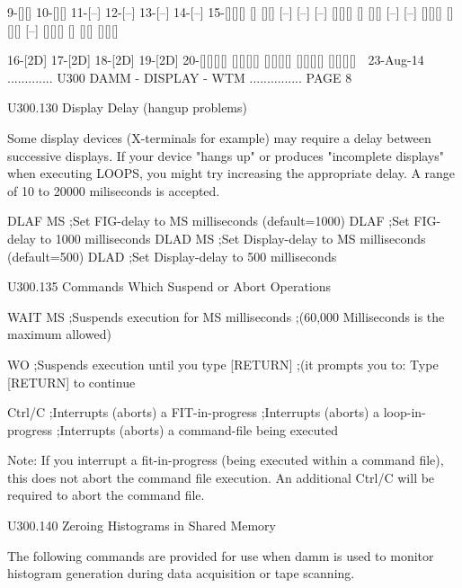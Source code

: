    9-[][]  10-[][]  11-[--]  12-[--]  13-[--]  14-[--]  15-[][][]
      []       [][]              [--]     [--]     [--]     [][][]
      []       [][]                       [--]     [--]     [][][]
      []       [][]                                [--]     [][][]
      []       [][]                                         [][][]
 
   16-[2D]  17-[2D]  18-[2D]  19-[2D]  20-[][][][]
                                          [][][][]
                                          [][][][]
                                          [][][][]
                                          [][][][]
    
   23-Aug-14 ............. U300  DAMM - DISPLAY - WTM ............... PAGE   8
 
 
   U300.130  Display Delay (hangup problems)
 
   Some display devices (X-terminals for example) may require a delay  between
   successive  displays.  If  your  device  "hangs up" or produces "incomplete
   displays" when executing LOOPS, you might try  increasing  the  appropriate
   delay. A range of 10 to 20000 miliseconds is accepted.
 
   DLAF MS        ;Set FIG-delay     to MS   milliseconds (default=1000)
   DLAF           ;Set FIG-delay     to 1000 milliseconds
   DLAD MS        ;Set Display-delay to MS   milliseconds (default=500)
   DLAD           ;Set Display-delay to 500  milliseconds
 
 
   U300.135  Commands Which Suspend or Abort Operations
 
   WAIT  MS             ;Suspends execution for MS milliseconds
                        ;(60,000 Milliseconds is the maximum allowed)
 
   WO                   ;Suspends execution until you  type [RETURN]
                        ;(it prompts you to: Type [RETURN] to continue
 
   Ctrl/C               ;Interrupts (aborts) a FIT-in-progress
                        ;Interrupts (aborts) a loop-in-progress
                        ;Interrupts (aborts) a command-file being executed
 
   Note:  If  you interrupt a fit-in-progress (being executed within a command
   file), this does not  abort  the  command  file  execution.  An  additional
   Ctrl/C will be required to abort the command file.
 
 
   U300.140  Zeroing Histograms in Shared Memory
 
   The  following  commands  are provided for use when damm is used to monitor
   histogram generation during data acquisition or tape scanning.
 
